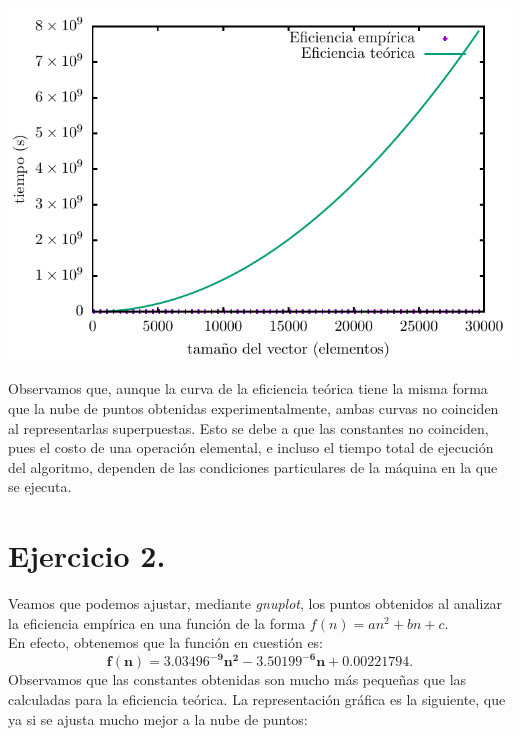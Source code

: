 \documentclass[11pt,a4paper]{article}
\newcommand{\bm}[1]{\boldsymbol{#1}}
\begin{document}
\begin{center}
	\includegraphics{img/tiempos_burbuja_teorica_superpuesta.pdf}
\end{center}

Observamos que, aunque la curva de la eficiencia teórica tiene la misma forma que la nube de puntos obtenidas experimentalmente, ambas curvas no coinciden al representarlas superpuestas. Esto se debe a que las constantes no coinciden, pues el costo de una operación elemental, e incluso el tiempo total de ejecución del algoritmo, dependen de las condiciones particulares de la máquina en la que se ejecuta.

\section*{Ejercicio 2.}
Veamos que podemos ajustar, mediante \textit{gnuplot}, los puntos obtenidos al analizar la eficiencia empírica en una función de la forma $f(n) = an^2 + bn + c$.\\

En efecto, obtenemos que la función en cuestión es: $$\bm{f(n) = 3.03496^{-9}n^2 - 3.50199^{-6} n + 0.00221794}.$$ Observamos que las constantes obtenidas son mucho más pequeñas que las calculadas para la eficiencia teórica. La representación gráfica es la siguiente, que ya si se ajusta mucho mejor a la nube de puntos:
\end{document}
